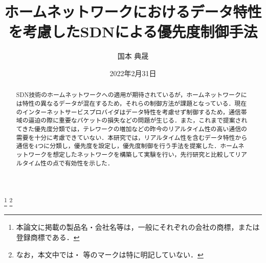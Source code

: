 \documentclass[a4paper,11pt,uplatex]{ujreport}
\title{ホームネットワークにおけるデータ特性を考慮したSDNによる優先度制御手法}  %
\author{国本 典晟}  %
\date{2022年2月31日}  %
\begin{document}
\maketitle
\clearpage

\begin{abstract}

  SDN技術のホームネットワークへの適用が期待されているが，ホームネットワークには特性の異なるデータが混在するため，それらの制御方法が課題となっている．現在のインターネットサービスプロバイダはデータ特性を考慮せず制御するため，通信帯域の逼迫の際に重要なパケットの損失などの問題が生じる．また，これまで提案されてきた優先度分類では，テレワークの増加などの昨今のリアルタイム性の高い通信の需要を十分に考慮できていない．本研究では，リアルタイム性を含むデータ特性から通信を4つに分類し，優先度を設定し，優先度制御を行う手法を提案した．ホームネットワークを想定したネットワークを構築して実験を行い，先行研究と比較してリアルタイム性の点で有効性を示した．

\end{abstract}


\footnote[0]{本論文に掲載の製品名・会社名等は，一般にそれぞれの会社の商標，または登録商標である．}
\footnote[0]{なお，本文中では\texttrademark ・ \textregistered 等のマークは特に明記していない．}


\setcounter{page}{0}
\end{document}
